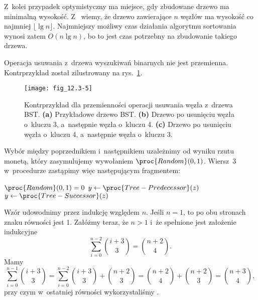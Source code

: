 Z~kolei przypadek optymistyczny ma miejsce, gdy zbudowane drzewo ma minimalną wysokość.
Z~ wiemy, że drzewo zawierające $n$ węzłów ma wysokość co najmniej $\lfloor\lg n\rfloor$.
Najmniejszy możliwy czas działania algorytmu sortowania wynosi zatem $O(n\lg n)$, bo to jest czas potrzebny na zbudowanie takiego drzewa.

\exercise %
\exercise %
Operacja usuwania z~drzewa wyszukiwań binarnych nie jest przemienna. Kontrprzykład został zilustrowany na rys.\ \ref{fig:12.3-5}.
\begin{figure}[ht]
	\begin{center}
		\texttt{[image: fig\_12.3-5]}
	\end{center}
	\caption{Kontrprzykład dla przemienności operacji usuwania węzła z~drzewa BST.
{\sffamily\bfseries(a)} Przykładowe drzewo BST.
{\sffamily\bfseries(b)} Drzewo po usunięciu węzła o~kluczu 3, a~następnie węzła o~kluczu 4.
{\sffamily\bfseries(c)} Drzewo po usunięciu węzła o~kluczu 4, a~następnie węzła o~kluczu 3.} \label{fig:12.3-5}
\end{figure}

\exercise %
Wybór między poprzednikiem i~następnikiem uzależnimy od wyniku rzutu monetą, który zasymulujemy wywołaniem $\proc{Random}(0,1)$.
Wiersz~3 w~procedurze  zastąpimy więc następującym fragmentem:
\begin{codebox}
\zi	\If $\proc{Random}(0,1)=0$
\zi		\Then $y\gets\proc{Tree-Predecessor}(z)$
\zi		\Else $y\gets\proc{Tree-Successor}(z)$
\zi		\End
\end{codebox}


\exercise %
Wzór udowodnimy przez indukcję względem $n$.
Jeśli $n=1$, to po obu stronach znaku równości jest 1.
Załóżmy teraz, że $n>1$ i~że spełnione jest założenie indukcyjne
\[
	\sum_{i=0}^{n-2}\binom{i+3}{3} = \binom{n+2}{4}.
\]
Mamy
\[
	\sum_{i=0}^{n-1}\binom{i+3}{3} = \sum_{i=0}^{n-2}\binom{i+3}{3}+\binom{n+2}{3} = \binom{n+2}{4}+\binom{n+2}{3} = \binom{n+3}{4},
\]
przy czym w~ostatniej równości wykorzystaliśmy .

\exercise %
\exercise %
\exercise %
\exercise %

\problems


\subproblem %
\subproblem %
\subproblem %
\subproblem %



\subproblem %
\subproblem %
\subproblem %
\subproblem %
\subproblem %
\subproblem %


\subproblem %
\subproblem %
\subproblem %
\subproblem %

\endinput
